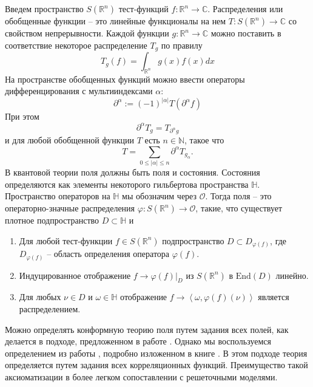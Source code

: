 Введем пространство $S(\mathbb{R}^{n})$ тест-функций $f:\mathbb{R}^{n}\to \mathbb{C}$. Распределения или обобщенные функции -- это линейные функционалы на нем $T:S(\mathbb{R}^{n})\to \mathbb{C}$ со свойством непрерывности. Каждой функции $g:\mathbb{R}^{n}\to \mathbb{C}$ можно поставить в соответствие некоторое распределение $T_{g}$ по правилу
\begin{equation}
  \label{eq:30}
  T_{g}(f)=\int_{\mathbb{R}^{n}}g(x)f(x) dx
\end{equation}
На пространстве обобщенных функций можно ввести операторы дифференцирования с мультииндексами $\alpha$:
\begin{equation}
  \label{eq:41}
  \partial^{\alpha}:=(-1)^{|\alpha|}T(\partial^{\alpha} f)
\end{equation}
При этом
\begin{equation}
  \label{eq:42}
  \partial^{\alpha}T_{g}=T_{\partial ^{\alpha}g}
\end{equation}
и для любой обобщенной функции $T$ есть $n\in \mathbb{N}$, такое что
\begin{equation}
  \label{eq:49}
  T=\sum_{0\leq |\alpha|\leq n}\partial^{\alpha} T_{g_{\alpha}}.
\end{equation}
В квантовой теории поля должны быть поля и состояния. Состояния определяются как элементы некоторого гильбертова пространства $\mathbb{H}$. Пространство операторов на $\mathbb{H}$ мы обозначим через $\mathcal{O}$. Тогда поля -- это операторно-значные распределения $\varphi:S(\mathbb{R}^{n})\to \mathcal{O}$, такие, что существует плотное подпространство $D\subset \mathbb{H}$ и
\begin{enumerate}
\item Для любой тест-функции $f\in S(\mathbb{R}^{n})$ подпространство $D\subset D_{\varphi(f)}$, где $D_{\varphi(f)}$ -- область определения оператора $\varphi(f)$.
\item Индуцированное отображение $f\to \varphi(f)|_{D}$ из $S(\mathbb{R}^{n})$ в $\mathrm{End}(D)$ линейно.
\item Для любых $\nu\in D$ и $\omega\in \mathbb{H}$ отображение $f\to \left<\omega,\varphi(f)(\nu)\right>$ является распределением. 
\end{enumerate}
Можно определять конформную теорию поля путем задания всех полей, как делается в подходе, предложенном в работе \cite{moore1989classical}. Однако мы воспользуемся определением из работы \cite{felder1989structure}, подробно изложенном в книге \cite{schottenloher2008mathematical}. В этом подходе теория определяется путем задания всех корреляционных функций. Преимущество такой аксиоматизации в более легком сопоставлении с решеточными моделями. 

